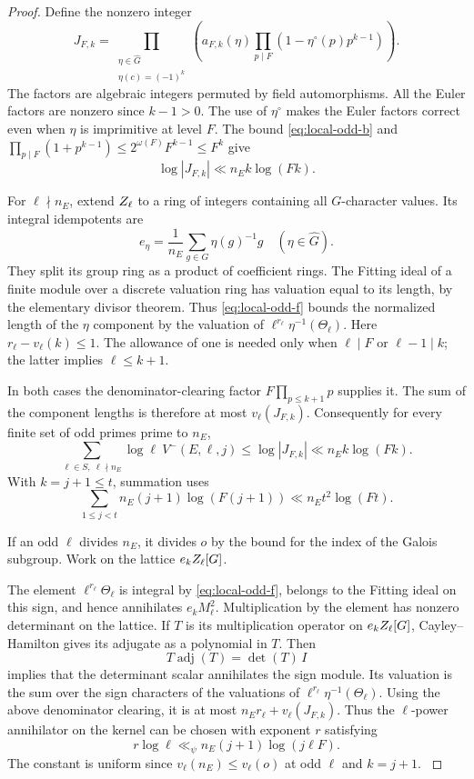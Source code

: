 \begin{proof}
Define the nonzero integer
\[
 J_{F,k}=
   \prod_{\substack{\eta\in\widehat G\\ \eta(c)=(-1)^k}}
    \left(a_{F,k}(\eta)
                 \prod_{p\mid F}(1-\eta^\circ(p)p^{k-1})\right).
\]
The factors are algebraic integers permuted by field
automorphisms. All the Euler factors are nonzero since
\(k-1>0\). The use of \(\eta^\circ\) makes the Euler factors
correct even when \(\eta\) is imprimitive at level \(F\).
The bound \eqref{eq:local-odd-b} and
\(\prod_{p\mid F}(1+p^{k-1})\le 2^{\omega(F)}F^{k-1}\le F^k\)
give
\[
                   \log |J_{F,k}|\ll n_E k\log(Fk).
\]


For \(\ell\nmid n_E\), extend \(Z_\ell\) to a ring of
integers containing all \(G\)-character values. Its integral idempotents are
\[
     e_\eta=\frac1{n_E}\sum_{g\in G}\eta(g)^{-1}g
          \quad(\eta\in\widehat G).
\]
They split its group ring as a product of coefficient rings. The Fitting ideal of a finite module
over a discrete valuation ring has valuation equal to its length,
by the elementary divisor theorem. Thus \eqref{eq:local-odd-f} bounds the normalized
length of the \(\eta\) component by the valuation of
\(\ell^{r_\ell}\eta^{-1}(\Theta_\ell)\).
Here \(r_\ell-v_\ell(k)\le 1\). The allowance of one is
needed only when \(\ell\mid F\) or \(\ell-1\mid k\); the latter
implies \(\ell\le k+1\).

In both cases the denominator-clearing
factor \(F\prod_{p\le k+1}p\) supplies it. The sum of the
component lengths is therefore at most \(v_\ell(J_{F,k})\).
Consequently for every finite set of odd primes prime to \(n_E\),
\[
 \sum_{\ell\in S,\ \ell\nmid n_E}\log\ell\ V^-(E,\ell,j)
       \le \log |J_{F,k}|\ll n_E k\log(Fk).
\]
With \(k=j+1\le t\), summation uses
\[
 \sum_{1\le j<t}n_E(j+1)\log(F(j+1))\ll n_Et^2\log(Ft).
\]

If an odd \(\ell\) divides \(n_E\), it divides \(o\) by
the bound for the index of the Galois subgroup. Work on the lattice \(e_kZ_\ell[G]\).

The element \(\ell^{r_\ell}\Theta_\ell\) is integral by
\eqref{eq:local-odd-f}, belongs to the Fitting ideal on this sign, and hence
annihilates \(e_k M_\ell^2\). Multiplication by the element
has nonzero determinant on the lattice. If \(T\) is its multiplication operator on \(e_kZ_\ell[G]\),
Cayley--Hamilton gives its adjugate as a polynomial in \(T\).
Then
\[
        T\operatorname{adj}(T)=\det(T)\,I
\]
implies that the determinant scalar annihilates the sign module.
Its valuation is the sum over the sign characters of the
valuations of \(\ell^{r_\ell}\eta^{-1}(\Theta_\ell)\).
Using the above denominator clearing, it is at most
\(n_E r_\ell+v_\ell(J_{F,k})\).
Thus the \(\ell\)-power annihilator on the kernel can be
chosen with exponent \(r\) satisfying
\[
   r\log\ell\ll_\psi n_E(j+1)\log(j\ell F).
 \tag{K}\label{eq:local-odd-k}
\]
The constant is uniform since \(v_\ell(n_E)\le v_\ell(o)\)
at odd \(\ell\) and \(k=j+1\).
\hfill\mbox{\cite{greither-popescu}}


\end{proof}
